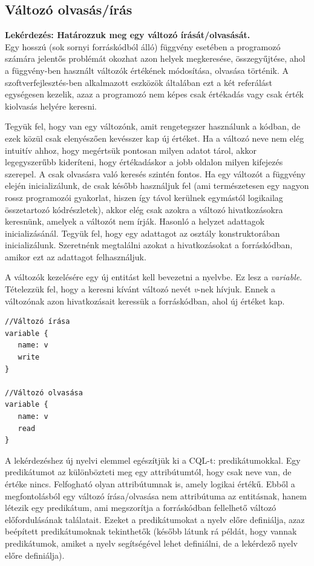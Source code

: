\documentclass[a4paper,12pt]{report}
\begin{document}
\subsection{Változó olvasás/írás}
\textbf{Lekérdezés: Határozzuk meg egy változó írását/olvasását.}
\\
Egy hosszú (sok sornyi forráskódból álló) függvény esetében a programozó számára jelentős problémát okozhat azon helyek megkeresése, összegyűjtése, ahol a függvény-ben használt változók értékének módosítása, olvasása történik. A szoftverfejlesztés-ben alkalmazott eszközök általában ezt a két referálást egységesen kezelik, azaz a programozó nem képes csak értékadás vagy csak érték kiolvasás helyére keresni. 
\par Tegyük fel, hogy van egy változónk, amit rengetegszer használunk a kódban, de ezek közül csak elenyészően kevésszer kap új értéket. Ha a változó neve nem elég intuitív ahhoz, hogy megértsük pontosan milyen adatot tárol, akkor legegyszerűbb kideríteni, hogy értékadáskor a jobb oldalon milyen kifejezés szerepel. A csak olvasásra való keresés szintén fontos. Ha egy változót a függvény elején inicializálunk, de csak később használjuk fel (ami természetesen egy nagyon rossz programozói gyakorlat, hiszen így távol kerülnek egymástól logikailag összetartozó kódrészletek), akkor elég csak azokra a változó hivatkozásokra keresnünk, amelyek a változót nem írják. Hasonló a helyzet adattagok inicializásánál. Tegyük fel, hogy egy adattagot az osztály konstruktorában inicializálunk. Szeretnénk megtalálni azokat a hivatkozásokat a forráskódban, amikor ezt az adattagot felhasználjuk.
\par A változók kezelésére egy új entitást kell bevezetni a nyelvbe. Ez lesz a \textit{variable}. Tételezzük fel, hogy a keresni kívánt változó nevét \textit{v}-nek hívjuk. Ennek a változónak azon hivatkozásait keressük a forráskódban, ahol új értéket kap.
\begin{verbatim}
//Változó írása
variable {
   name: v
   write
}

//Változó olvasása
variable {
   name: v
   read
}
\end{verbatim}
\par A lekérdezéshez új nyelvi elemmel egészítjük ki a CQL-t: predikátumokkal. Egy predikátumot az különbözteti meg egy attribútumtól, hogy csak neve van, de értéke nincs. Felfogható olyan attribútumnak is, amely logikai értékű. Ebből a megfontolásból egy változó írása/olvasása nem attribútuma az entitásnak, hanem létezik egy predikátum, ami megszorítja a forráskódban fellelhető változó előfordulásának találatait. Ezeket a predikátumokat a nyelv előre definiálja, azaz beépített predikátumoknak tekinthetők (később látunk rá példát, hogy vannak predikátumok, amiket a nyelv segítségével lehet definiálni, de a lekérdező nyelv előre definiálja).
\end{document}
